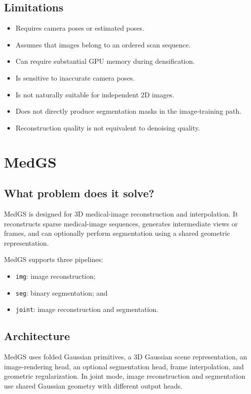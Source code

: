 \documentclass[11pt,a4paper]{article}
\begin{document}
\subsection{Limitations}
\begin{itemize}
    \item Requires camera poses or estimated poses.
    \item Assumes that images belong to an ordered scan sequence.
    \item Can require substantial GPU memory during densification.
    \item Is sensitive to inaccurate camera poses.
    \item Is not naturally suitable for independent 2D images.
    \item Does not directly produce segmentation masks in the image-training path.
    \item Reconstruction quality is not equivalent to denoising quality.
\end{itemize}

\section{MedGS}

\subsection{What problem does it solve?}
MedGS is designed for 3D medical-image reconstruction and interpolation. It reconstructs sparse medical-image sequences, generates intermediate views or frames, and can optionally perform segmentation using a shared geometric representation.

MedGS supports three pipelines:
\begin{itemize}
    \item \texttt{img}: image reconstruction;
    \item \texttt{seg}: binary segmentation; and
    \item \texttt{joint}: image reconstruction and segmentation.
\end{itemize}

\subsection{Architecture}
MedGS uses folded Gaussian primitives, a 3D Gaussian scene representation, an image-rendering head, an optional segmentation head, frame interpolation, and geometric regularization. In joint mode, image reconstruction and segmentation use shared Gaussian geometry with different output heads.
\end{document}
